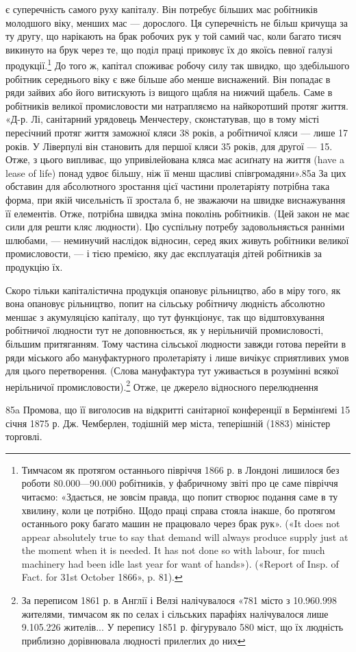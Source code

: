 є суперечність самого руху капіталу. Він потребує більших мас робітників молодшого віку, менших мас
— дорослого. Ця суперечність не більш кричуща за ту другу, що нарікають на брак робочих рук у той
самий час, коли багато тисяч викинуто на
брук через те, що поділ праці приковує їх до якоїсь певної галузі продукції.\footnote{
Тимчасом як протягом останнього півріччя 1866 р. в Лондоні лишилося без роботи 80.000—90.000
робітників, у фабричному звіті про це саме півріччя читаємо: «Здається, не зовсім правда, що попит
створює подання саме в ту хвилину, коли це потрібно. Щодо праці справа стояла інакше, бо протягом
останнього року багато машин не працювало через брак рук». («It does not appear absolutely true to
say that demand
will always produce supply just at the moment when it is needed. It has not done so with labour, for
much machinery had been idle last year for want of hands»). («Report of Insp. of Fact. for 31st
October 1866», p. 81).
} До того ж, капітал
споживає робочу силу так швидко, що здебільшого робітник середнього віку є вже більше або менше
виснажений. Він попадає в ряди зайвих або його витискують
із вищого щабля на нижчий щабель. Саме в робітників великої промисловости ми натрапляємо на
найкоротший протяг життя. «Д-р. Лі, санітарний урядовець Менчестеру, сконстатував, що в тому місті
пересічний протяг життя заможної кляси
38 років, а робітничої кляси — лише 17 років. У Ліверпулі він становить для першої кляси 35 років,
для другої — 15. Отже, з цього випливає, що упривілейована кляса має асиґнату на життя (have a lease
of life) понад удвоє більшу, ніж її менш щасливі співгромадяни».85а За цих обставин для абсолютного
зростання цієї частини пролетаріяту потрібна така форма, при якій чисельність її зростала б, не
зважаючи на швидке виснажування її елементів. Отже, потрібна швидка зміна поколінь робітників.
(Цей закон не має сили для решти кляс людности).
Цю суспільну потребу задовольняється ранніми шлюбами, — неминучий наслідок відносин, серед яких
живуть робітники великої промисловости, — і тією премією, яку дає експлуатація дітей робітників за
продукцію їх.

Скоро тільки капіталістична продукція опановує рільництво, або в міру того, як вона опановує
рільництво, попит на сільську робітничу людність абсолютно меншає з акумуляцією капіталу, що тут
функціонує, так що відштовхування робітничої людности
тут не доповнюється, як у нерільничій промисловості, більшим притяганням. Тому частина сільської
людности завжди готова перейти в ряди міського або мануфактурного пролетаріяту і лише вичікує
сприятливих умов для цього перетворення. (Слова мануфактура тут уживається в розумінні всякої
нерільничої
промисловости).\footnote{
За переписом 1861 р. в Англії і Велзі налічувалося «781 місто з 10.960.998 жителями, тимчасом як
по селах і сільських парафіях налічувалося лише 9.105.226 жителів... У перепису 1851 р. фігурувало
580 міст, що їх людність приблизно дорівнювала людності прилеглих до них
} Отже, це джерело відносного перелюднення

85a Промова, що її виголосив на відкритті санітарної конференції в Бермінґемі 15 січня 1875 р. Дж.
Чемберлен, тодішній мер міста, теперішній (1883) міністер торговлі.